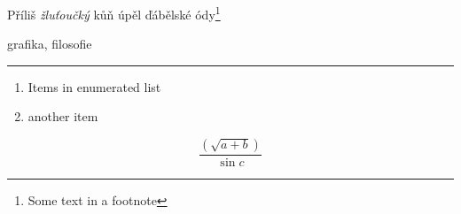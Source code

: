 \documentclass{article}
\begin{document}
Příliš \textit{žluťoučký} kůň úpěl ďábělské ódy\footnote{Some text in a footnote}

grafika, filosofie

\hrule

\begin{enumerate}
\item Items in enumerated list
\item another item
\end{enumerate}

\[\frac{\left(\sqrt{a + b}\right)}{\sin{c}}\]
\end{document}
